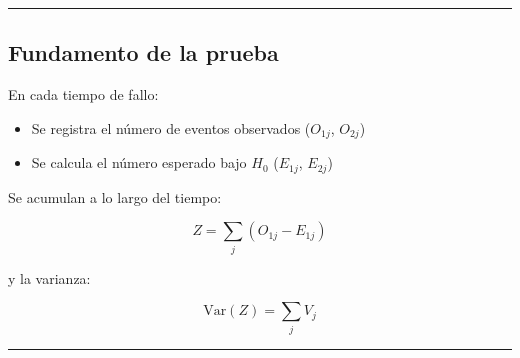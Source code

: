 \documentclass[
]{article}
\providecommand{\tightlist}{%
  \setlength{\itemsep}{0pt}\setlength{\parskip}{0pt}}
\begin{document}
\begin{center}\rule{0.5\linewidth}{0.5pt}\end{center}

\subsection{Fundamento de la prueba}\label{fundamento-de-la-prueba}

En cada tiempo de fallo:

\begin{itemize}
\tightlist
\item
  Se registra el número de eventos observados (\(O_{1j}\), \(O_{2j}\))
\item
  Se calcula el número esperado bajo \(H_0\) (\(E_{1j}\), \(E_{2j}\))
\end{itemize}

Se acumulan a lo largo del tiempo:

\[
Z = \sum_j (O_{1j} - E_{1j})
\]

y la varianza:

\[
\text{Var}(Z) = \sum_j V_j
\]

\begin{center}\rule{0.5\linewidth}{0.5pt}\end{center}
\end{document}
